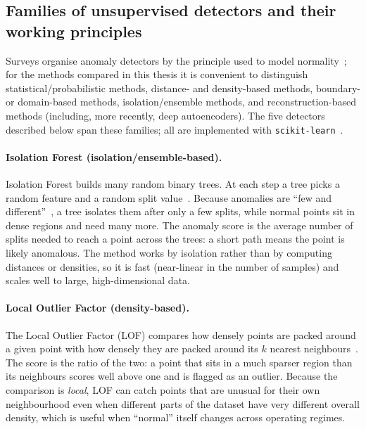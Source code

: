 \subsection{Families of unsupervised detectors and their working principles}
\label{subsec:anomaly-methods}

Surveys organise anomaly detectors by the principle used to model
normality~\cite{chandola2009anomaly}; for the methods compared in this thesis it
is convenient to distinguish statistical/probabilistic methods, distance- and
density-based methods, boundary- or domain-based methods, isolation/ensemble
methods, and reconstruction-based methods (including, more recently, deep
autoencoders). The five detectors
described below span these families; all are implemented with
\texttt{scikit-learn}~\cite{pedregosa2011scikit}.

\paragraph{Isolation Forest (isolation/ensemble-based).}
Isolation Forest builds many random binary trees. At each step a tree picks a
random feature and a random split value~\cite{liu2008isolation}. Because
anomalies are ``few and different''~\cite{liu2008isolation}, a tree isolates
them after only a few splits,
while normal points sit in dense regions and need many more. The anomaly score is
the average number of splits needed to reach a point across the trees: a short
path means the point is likely anomalous. The method works by isolation rather
than by computing distances or densities, so it is fast (near-linear in the
number of samples) and scales well to large, high-dimensional data.

\paragraph{Local Outlier Factor (density-based).}
The Local Outlier Factor (LOF) compares how densely points are packed around a
given point with how densely they are packed around its $k$ nearest
neighbours~\cite{breunig2000lof}. The score is the ratio of the two: a point that
sits in a much sparser region than its neighbours scores well above one and is
flagged as an outlier. Because the comparison is \emph{local}, LOF can catch
points that are unusual for their own neighbourhood even when different parts of
the dataset have very different overall density, which is useful when ``normal''
itself changes across operating regimes.


